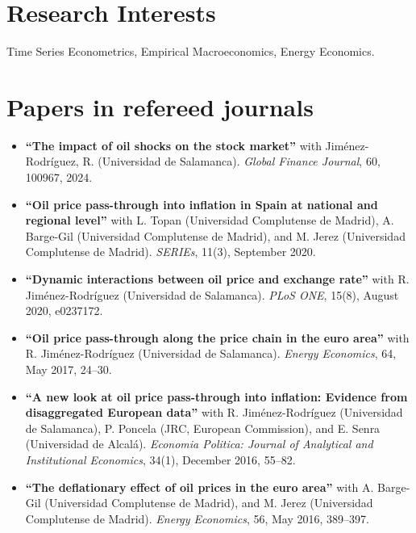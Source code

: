 \documentclass[11pt]{article}\usepackage[]{graphicx}\usepackage[usenames,dvipsnames]{xcolor}
\begin{document}
{%
\section{Research Interests}
Time Series Econometrics, Empirical Macroeconomics, Energy Economics.\\

\section{Papers in refereed journals}
\begin{itemize}

  \item \textbf{``The impact of oil shocks on the stock market''} with Jiménez-Rodríguez, R. (Universidad de Salamanca).
  \emph{Global Finance Journal}, 60, 100967, 2024.

  \item \textbf{``Oil price pass-through into inflation in Spain at national and regional level''} with L. Topan (Universidad Complutense de Madrid), A. Barge-Gil (Universidad Complutense de Madrid), and M. Jerez (Universidad Complutense de Madrid). \emph{SERIEs}, 11(3), September 2020.

  \item \textbf{``Dynamic interactions between oil price and exchange rate''} with R. Jiménez-Rodríguez (Universidad de Salamanca). \emph{PLoS ONE}, 15(8), August 2020,  e0237172.

  \item \textbf{``Oil price pass-through along the price chain in the euro area''} with R. Jiménez-Rodríguez (Universidad de Salamanca). \emph{Energy Economics}, 64, May 2017, 24--30.

  \item \textbf{``A new look at oil price pass-through into inflation: Evidence from disaggregated European data''} with R. Jiménez-Rodríguez (Universidad de Salamanca), P. Poncela (JRC, European Commission), and E. Senra (Universidad de Alcalá). \emph{Economia Politica: Journal of Analytical and Institutional Economics}, 34(1), December 2016, 55--82.

  \item \textbf{``The deflationary effect of oil prices in the euro area''} with A. Barge-Gil (Universidad Complutense de Madrid), and M. Jerez (Universidad Complutense de Madrid). \emph{Energy Economics}, 56, May 2016, 389--397.
\end{itemize}

}
\end{document}
